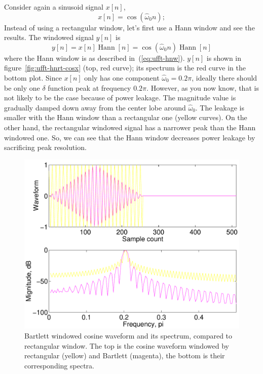 Consider again a sinusoid signal $x[n]$, 
\begin{equation}
x[n] = \cos(\hat{\omega}_0 n);
\end{equation}
Instead of using a rectangular window, let's first use a Hann window
and see the results. The windowed signal $y[n]$ is
\begin{equation}
y[n] = x[n] \operatorname{Hann}[n]
     = \cos(\hat{\omega}_0 n)\operatorname{Hann}[n]
\end{equation}
where the Hann window is as described in~(\ref{eq:ufft-hnw}). $y[n]$
is shown in figure~\ref{fig:ufft-hnrt-cosx} (top, red curve); its
spectrum is the red curve in the bottom plot. Since $x[n]$ only has
one component $\hat{\omega}_0=0.2\pi$, ideally there should be only
one $\delta$ function peak at frequency $0.2\pi$. However, as you now
know, that is not likely to be the case because of power leakage. The
magnitude value is gradually damped down away from the center lobe
around $\hat{\omega}_0$. The leakage is smaller with the Hann window
than a rectangular one (yellow curves). On the other hand, the
rectangular windowed signal has a narrower peak than the Hann windowed
one. So, we can see that the Hann window decreases power leakage by
sacrificing peak resolution.

\begin{figure}
\centerline{\includegraphics[height=0.35\textheight]{ch-fft/ufft_bartlrect_cosx512_256}}
\caption[Bartlett windowed cosine waveform and its spectrum]{Bartlett
windowed cosine waveform and its spectrum, compared to rectangular
window. The top is the cosine waveform windowed by rectangular
(yellow) and Bartlett (magenta), the bottom is their corresponding
spectra.\label{fig:ufft-bart-cosx}}
\end{figure}

